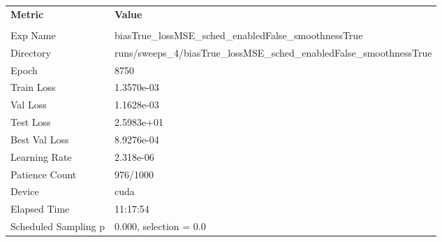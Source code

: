 \begin{tabular}{|l|l|}
\hline
\textbf{Metric} & \textbf{Value} \\\\
Exp Name & biasTrue_lossMSE_sched_enabledFalse_smoothnessTrue \\ 
Directory & runs/sweeps_4/biasTrue_lossMSE_sched_enabledFalse_smoothnessTrue \\ 
Epoch & 8750 \\ 
Train Loss & 1.3570e-03 \\ 
Val Loss & 1.1628e-03 \\ 
Test Loss & 2.5983e+01 \\ 
Best Val Loss & 8.9276e-04 \\ 
Learning Rate & 2.318e-06 \\ 
Patience Count & 976/1000 \\ 
Device & cuda \\ 
Elapsed Time & 11:17:54 \\ 
Scheduled Sampling p & 0.000, selection = 0.0 \\ 
\hline
\end{tabular}